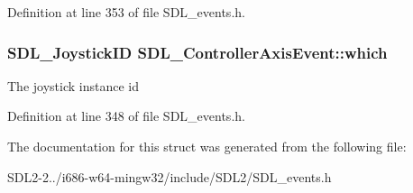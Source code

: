 Definition at line 353 of file S\+D\+L\+\_\+events.\+h.

\hypertarget{structSDL__ControllerAxisEvent_a07087f68ea9d64b50047d65312ee7b94}{
\subsubsection[{which}]{\setlength{\rightskip}{0pt plus 5cm}S\+D\+L\+\_\+\+Joystick\+I\+D S\+D\+L\+\_\+\+Controller\+Axis\+Event\+::which}}\label{structSDL__ControllerAxisEvent_a07087f68ea9d64b50047d65312ee7b94}
The joystick instance id 

Definition at line 348 of file S\+D\+L\+\_\+events.\+h.



The documentation for this struct was generated from the following file\+:\begin{DoxyCompactItemize}
\item 
S\+D\+L2-\/2../i686-\/w64-\/mingw32/include/\+S\+D\+L2/S\+D\+L\+\_\+events.\+h\end{DoxyCompactItemize}
